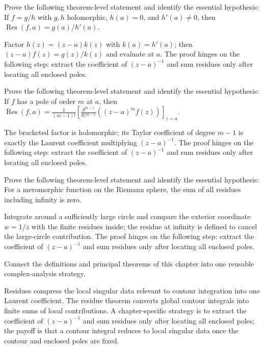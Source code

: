 \begin{problem}\label{prob:iv10-problem-09}
Prove the following theorem-level statement and identify the essential hypothesis: If $f=g/h$ with $g,h$ holomorphic, $h(a)=0$, and $h'(a)\ne0$, then $\operatorname{Res}(f,a)=g(a)/h'(a)$.
\end{problem}
\begin{solution}
Factor $h(z)=(z-a)k(z)$ with $k(a)=h'(a)$; then $(z-a)f(z)=g(z)/k(z)$ and evaluate at $a$. The proof hinges on the following step: extract the coefficient of \((z-a)^{-1}\) and sum residues only after locating all enclosed poles.
\end{solution}

\begin{problem}\label{prob:iv10-problem-10}
Prove the following theorem-level statement and identify the essential hypothesis: If $f$ has a pole of order $m$ at $a$, then $\operatorname{Res}(f,a)=\frac1{(m-1)!}\left[\frac{d^{m-1}}{dz^{m-1}}((z-a)^mf(z))\right]_{z=a}$.
\end{problem}
\begin{solution}
The bracketed factor is holomorphic; its Taylor coefficient of degree $m-1$ is exactly the Laurent coefficient multiplying $(z-a)^{-1}$. The proof hinges on the following step: extract the coefficient of \((z-a)^{-1}\) and sum residues only after locating all enclosed poles.
\end{solution}

\begin{problem}\label{prob:iv10-problem-11}
Prove the following theorem-level statement and identify the essential hypothesis: For a meromorphic function on the Riemann sphere, the sum of all residues including infinity is zero.
\end{problem}
\begin{solution}
Integrate around a sufficiently large circle and compare the exterior coordinate $w=1/z$ with the finite residues inside; the residue at infinity is defined to cancel the large-circle contribution. The proof hinges on the following step: extract the coefficient of \((z-a)^{-1}\) and sum residues only after locating all enclosed poles.
\end{solution}

\begin{problem}\label{prob:iv10-problem-12}
Connect the definitions and principal theorems of this chapter into one reusable complex-analysis strategy.
\end{problem}
\begin{solution}
Residues compress the local singular data relevant to contour integration into one Laurent coefficient. The residue theorem converts global contour integrals into finite sums of local contributions. A chapter-specific strategy is to extract the coefficient of \((z-a)^{-1}\) and sum residues only after locating all enclosed poles; the payoff is that a contour integral reduces to local singular data once the contour and enclosed poles are fixed.
\end{solution}

